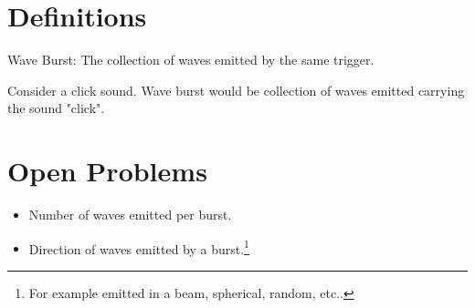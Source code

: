 \documentclass[11pt]{article}
\begin{document}
\section{Definitions}
\label{sec:orgd5524ae}
\begin{definition}{Wave Burst:}
The collection of waves emitted by the same trigger.
\end{definition}
\begin{example}
Consider a click sound. Wave burst would be collection of waves emitted carrying the sound "click".
\end{example}
\section{Open Problems}
\label{sec:orgb0de525}
\begin{itemize}
\item Number of waves emitted per burst.
\item Direction of waves emitted by a burst.\footnote{For example emitted in a beam, spherical, random, etc..}
\end{itemize}
\end{document}
